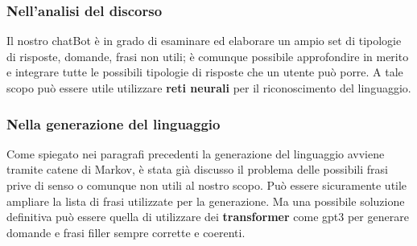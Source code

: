 \subsubsection{Nell'analisi del discorso}
Il nostro chatBot è in grado di esaminare ed elaborare un ampio set di tipologie di risposte, domande, frasi non utili; è comunque possibile approfondire in merito e integrare tutte le possibili tipologie di risposte che un utente può porre. A tale scopo può essere utile utilizzare \textbf{reti neurali} per il riconoscimento del linguaggio.
\subsubsection{Nella generazione del linguaggio}
Come spiegato nei paragrafi precedenti la generazione del linguaggio avviene tramite catene di Markov, è stata già discusso il problema delle possibili frasi prive di senso o comunque non utili al nostro scopo. Può essere sicuramente utile ampliare la lista di frasi utilizzate per la generazione. Ma una possibile soluzione definitiva può essere quella di utilizzare dei \textbf{transformer} come gpt3 per generare domande e frasi filler sempre corrette e coerenti.